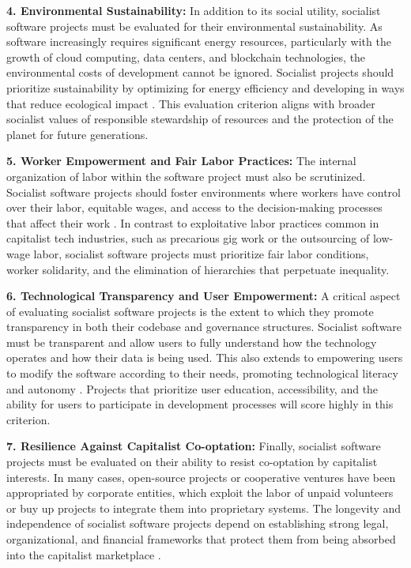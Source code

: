 \begin{refsection}
\textbf{4. Environmental Sustainability:}  
In addition to its social utility, socialist software projects must be evaluated for their environmental sustainability. As software increasingly requires significant energy resources, particularly with the growth of cloud computing, data centers, and blockchain technologies, the environmental costs of development cannot be ignored. Socialist projects should prioritize sustainability by optimizing for energy efficiency and developing in ways that reduce ecological impact \cite[pp.~105]{klein}. This evaluation criterion aligns with broader socialist values of responsible stewardship of resources and the protection of the planet for future generations.

\textbf{5. Worker Empowerment and Fair Labor Practices:}  
The internal organization of labor within the software project must also be scrutinized. Socialist software projects should foster environments where workers have control over their labor, equitable wages, and access to the decision-making processes that affect their work \cite[pp.~89]{scholz2}. In contrast to exploitative labor practices common in capitalist tech industries, such as precarious gig work or the outsourcing of low-wage labor, socialist software projects must prioritize fair labor conditions, worker solidarity, and the elimination of hierarchies that perpetuate inequality.

\textbf{6. Technological Transparency and User Empowerment:}  
A critical aspect of evaluating socialist software projects is the extent to which they promote transparency in both their codebase and governance structures. Socialist software must be transparent and allow users to fully understand how the technology operates and how their data is being used. This also extends to empowering users to modify the software according to their needs, promoting technological literacy and autonomy \cite[pp.~45]{raymond2}. Projects that prioritize user education, accessibility, and the ability for users to participate in development processes will score highly in this criterion.

\textbf{7. Resilience Against Capitalist Co-optation:}  
Finally, socialist software projects must be evaluated on their ability to resist co-optation by capitalist interests. In many cases, open-source projects or cooperative ventures have been appropriated by corporate entities, which exploit the labor of unpaid volunteers or buy up projects to integrate them into proprietary systems. The longevity and independence of socialist software projects depend on establishing strong legal, organizational, and financial frameworks that protect them from being absorbed into the capitalist marketplace \cite[pp.~250]{weber2}.


\end{refsection}
